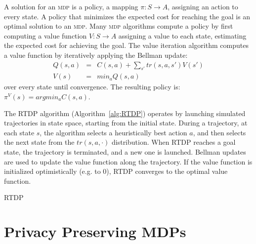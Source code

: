 \documentclass[letterpaper]{article} %
\newcommand{\mdp}{\textsc {mdp}\xspace}
\theoremstyle{remark}
\begin{document}
A solution for an \mdp is a policy, a mapping $\pi:S \rightarrow A$, assigning an action to every state. A policy that minimizes the expected cost  for reaching the goal is an optimal solution to an \mdp.
Many \mdp algorithms compute a policy by first computing a value function $V:S \rightarrow A$ assigning a value to each state, estimating the expected cost for achieving the goal.
The value iteration algorithm computes a value function by iteratively applying the Bellman update:
\begin{eqnarray}
Q(s,a) &=& C(s,a)+ \sum_{s'} tr(s,a,s') V(s')\\
V(s) &=& min_a Q(s,a)
\end{eqnarray}
over every state until convergence. The resulting policy is:
$\pi^V(s) = argmin_a C(s,a)$.

The RTDP algorithm (Algorithm~\ref{alg:RTDP}) \cite[e.g.]{kolobov2012planning} operates by launching simulated trajectories in state space, starting from the initial state. During a trajectory, at each state $s$, the algorithm selects a heuristically best action $a$, and then selects the next state from the $tr(s,a,\cdot)$ distribution. When RTDP reaches a goal state, the trajectory is terminated, and a new one is launched. Bellman updates are used to update the value function along the trajectory. If the value function is initialized optimistically (e.g. to 0), RTDP converges to the optimal value function.

\begin{algorithm}[t!]
\footnotesize
\caption{RTDP}
    \label{alg:RTDP}
\end{algorithm}





\section{Privacy Preserving MDPs}
\end{document}
